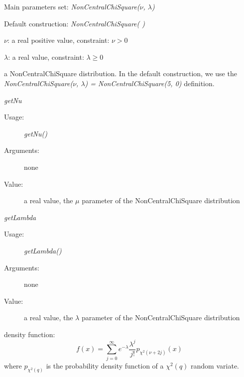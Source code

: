 \begin{description}

\item[Usage:] \rule{0pt}{1em}
\begin{description}
\item Main parameters set: \textit{NonCentralChiSquare($\nu$, $\lambda$)}
\item Default construction: \textit{NonCentralChiSquare( )}
\end{description}

\item[Arguments:]  \rule{0pt}{1em}
\begin{description}
\item $\nu$:  a real positive value,  constraint: $\nu > 0$
\item $\lambda$:  a real value, constraint: $\lambda \geq 0$
\end{description}

\item[Value:] a NonCentralChiSquare distribution. In the default construction, we use the \textit{NonCentralChiSquare($\nu$, $\lambda$) = NonCentralChiSquare(5, 0)} definition.

\item[Some methods:] \rule{0pt}{1em}
\begin{description}

\item \textit{getNu}
\begin{description}
\item[Usage:] \textit{getNu()}
\item[Arguments:] none
\item[Value:]  a real value,  the $\mu$ parameter of the NonCentralChiSquare distribution
\end{description}
\bigskip

\item \textit{getLambda}
\begin{description}
\item[Usage:] \textit{getLambda()}
\item[Arguments:] none
\item[Value:]  a real value,  the $\lambda$ parameter of the NonCentralChiSquare distribution
\end{description}
\bigskip
\end{description}

\item[Details:]  \rule{0pt}{1em}
\begin{description}
\item density function:
\begin{equation}
f(x) = \displaystyle \sum_{j=0}^{\infty} e^{-\lambda}\frac{\lambda^j}{j!}p_{\chi^2(\nu+2j)}(x)
\end{equation}
where $p_{\chi^2(q)}$ is the probability density function of a $\chi^2(q)$ random variate.
\end{description}

\item[Links:]  \rule{0pt}{1em}
\end{description}


